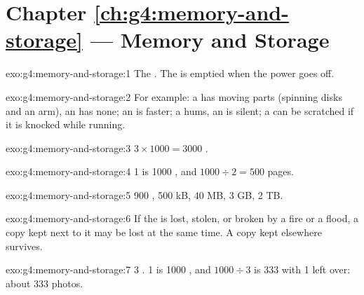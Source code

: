 \section*{Chapter \ref{ch:g4:memory-and-storage} --- Memory and Storage}

\begin{solution}{exo:g4:memory-and-storage:1}
The . The  is emptied when the power goes off.
\end{solution}

\begin{solution}{exo:g4:memory-and-storage:2}
For example: a  has moving parts (spinning disks and an arm), an 
has none; an  is faster; a  hums, an  is silent; a 
can be scratched if it is knocked while running.
\end{solution}

\begin{solution}{exo:g4:memory-and-storage:3}
$3 \times \num{1000} = \num{3000}$ .
\end{solution}

\begin{solution}{exo:g4:memory-and-storage:4}
1  is \num{1000} , and $\num{1000} \div 2 = 500$ pages.
\end{solution}

\begin{solution}{exo:g4:memory-and-storage:5}
900 , 500 kB, 40 MB, 3 GB, 2 TB.
\end{solution}

\begin{solution}{exo:g4:memory-and-storage:6}
If the  is lost, stolen, or broken by a fire or a flood, a copy kept
next to it may be lost at the same time. A copy kept elsewhere survives.
\end{solution}

\begin{solution}{exo:g4:memory-and-storage:7}
3 . 1  is \num{1000} , and $\num{1000} \div 3$ is
333 with 1 left over: about 333 photos.
\end{solution}

